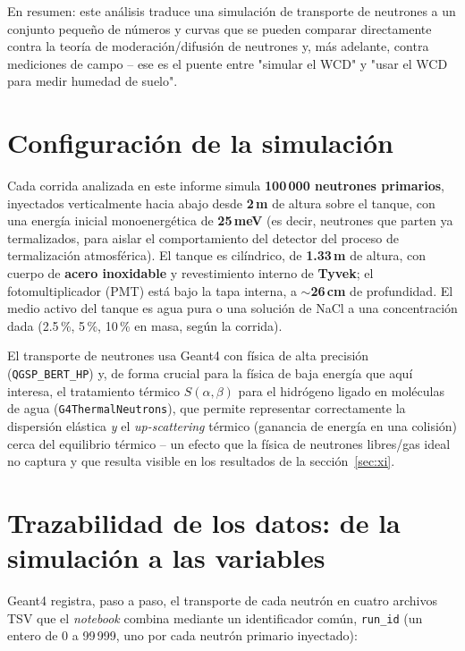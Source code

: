 \documentclass[11pt,a4paper]{article}
\newcommand{\codigo}[1]{\nolinkurl{#1}}
\newcommand{\var}[1]{\texttt{#1}}
\begin{document}
En resumen: este análisis traduce una simulación de transporte de neutrones a un conjunto pequeño
de números y curvas que se pueden comparar directamente contra la teoría de moderación/difusión de
neutrones y, más adelante, contra mediciones de campo -- ese es el puente entre "simular el WCD" y
"usar el WCD para medir humedad de suelo".

\section{Configuración de la simulación}
\label{sec:sim}

Cada corrida analizada en este informe simula \textbf{100\,000 neutrones primarios}, inyectados
verticalmente hacia abajo desde \textbf{2\,m} de altura sobre el tanque, con una energía inicial
monoenergética de \textbf{25\,meV} (es decir, neutrones que parten ya termalizados, para aislar el
comportamiento del detector del proceso de termalización atmosférica). El tanque es cilíndrico, de
\textbf{1.33\,m} de altura, con cuerpo de \textbf{acero inoxidable} y revestimiento interno de
\textbf{Tyvek}; el fotomultiplicador (PMT) está bajo la tapa interna, a \textbf{$\sim$26\,cm} de
profundidad. El medio activo del tanque es agua pura o una solución de NaCl a una concentración
dada (2.5\,\%, 5\,\%, 10\,\% en masa, según la corrida).

El transporte de neutrones usa Geant4 con física de alta precisión (\codigo{QGSP\_BERT\_HP}) y, de
forma crucial para la física de baja energía que aquí interesa, el tratamiento térmico
$S(\alpha,\beta)$ para el hidrógeno ligado en moléculas de agua (\codigo{G4ThermalNeutrons}), que
permite representar correctamente la dispersión elástica \emph{y} el \textit{up-scattering} térmico
(ganancia de energía en una colisión) cerca del equilibrio térmico -- un efecto que la física de
neutrones libres/gas ideal no captura y que resulta visible en los resultados de la
sección~\ref{sec:xi}.

\section{Trazabilidad de los datos: de la simulación a las variables}
\label{sec:pipeline}

Geant4 registra, paso a paso, el transporte de cada neutrón en cuatro archivos TSV que el
\textit{notebook} combina mediante un identificador común, \var{run\_id} (un entero de 0 a 99\,999,
uno por cada neutrón primario inyectado):
\end{document}
